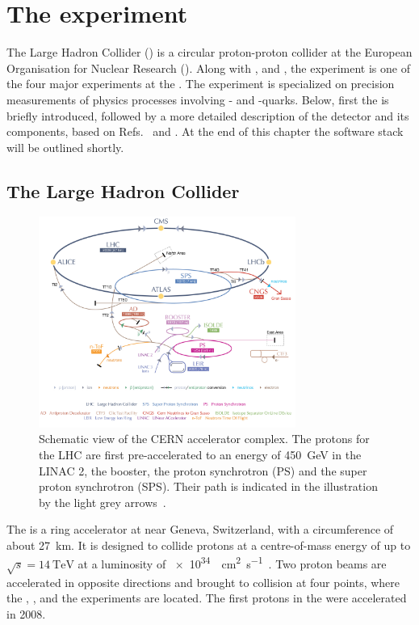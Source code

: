 \chapter{The \lhcb experiment}
\label{chap:lhcb}

\linespread{1.08}\selectfont
The Large Hadron Collider (\lhc) is a circular proton-proton collider at the European Organisation for Nuclear Research (\cern).
Along with \atlas, \cms and \alice, the \lhcb experiment is one of the four major experiments at the \lhc.
The experiment is specialized on precision measurements of physics processes involving \bquark- and \cquark-quarks.
Below, first the \lhc is briefly introduced, followed by a more detailed description of the \lhcb detector and its components, based on Refs.~\cite{Alves:2008zz} and \cite{Aaij:2014jba}.
At the end of this chapter the \lhcb software stack will be outlined shortly.

\section{The Large Hadron Collider}

\begin{figure}[tb]
    \centering
    \includegraphics[width=0.75\textwidth]{05lhcb/figs/cern.pdf}
    \caption{Schematic view of the CERN accelerator complex.
    The protons for the LHC are first pre-accelerated to an energy of \SI{450}{\giga\electronvolt} in the LINAC 2, the booster, the proton synchrotron (PS) and the super proton synchrotron (SPS).
    Their path is indicated in the illustration by the light grey arrows~\cite{Christiane:1260465}.}
    \label{fig:CernAccelerators}
\end{figure}
The \lhc is a ring accelerator at \cern near Geneva, Switzerland, with a circumference of about \SI{27}{\kilo\metre}.
It is designed to collide protons at a centre-of-mass energy of up to $\sqrt{s} = \SI{14}{\tera\electronvolt}$ at a luminosity of \SI{e34}{\per\cm\squared\per\second}~\cite{Bruening:782076}.
Two proton beams are accelerated in opposite directions and brought to collision at four points, where the \atlas, \cms, \alice and the \lhcb experiments are located.
The first protons in the \lhc were accelerated in \num{2008}.

